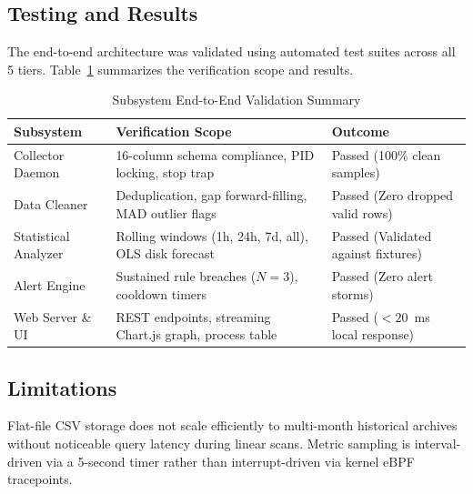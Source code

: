 \subsection{Testing and Results}
The end-to-end architecture was validated using automated test suites across all 5 tiers. Table~\ref{tab:intro_test} summarizes the verification scope and results.

\begin{table}[htbp]
    \centering
    \small
    \begin{tabularx}{\textwidth}{lXX}
        \toprule
        Subsystem & Verification Scope & Outcome \\
        \midrule
        Collector Daemon & 16-column schema compliance, PID locking, stop trap & Passed (100\% clean samples) \\
        Data Cleaner & Deduplication, gap forward-filling, MAD outlier flags & Passed (Zero dropped valid rows) \\
        Statistical Analyzer & Rolling windows (1h, 24h, 7d, all), OLS disk forecast & Passed (Validated against fixtures) \\
        Alert Engine & Sustained rule breaches ($N=3$), cooldown timers & Passed (Zero alert storms) \\
        Web Server \& UI & REST endpoints, streaming Chart.js graph, process table & Passed ($<20$~ms local response) \\
        \bottomrule
    \end{tabularx}
    \caption{Subsystem End-to-End Validation Summary}
    \label{tab:intro_test}
\end{table}

\subsection{Limitations}
Flat-file CSV storage does not scale efficiently to multi-month historical archives without noticeable query latency during linear scans. Metric sampling is interval-driven via a 5-second timer rather than interrupt-driven via kernel eBPF tracepoints.
